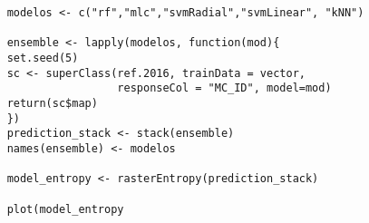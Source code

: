 \documentclass[a4paper]{article}
\begin{document}
\begin{lstlisting}
    modelos <- c("rf","mlc","svmRadial","svmLinear", "kNN")
      
    ensemble <- lapply(modelos, function(mod){
    set.seed(5)
    sc <- superClass(ref.2016, trainData = vector,
                     responseCol = "MC_ID", model=mod)
    return(sc$map)
    })
    prediction_stack <- stack(ensemble)
    names(ensemble) <- modelos
    
    model_entropy <- rasterEntropy(prediction_stack)

    plot(model_entropy
\end{lstlisting}
\end{document}
